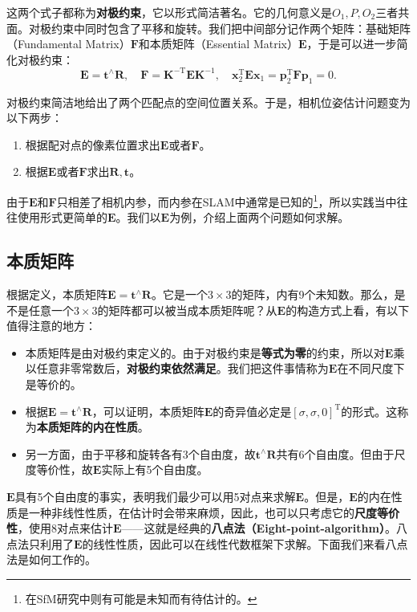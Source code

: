 这两个式子都称为\textbf{对极约束}，它以形式简洁著名。它的几何意义是$O_1, P, O_2$三者共面。对极约束中同时包含了平移和旋转。我们把中间部分记作两个矩阵：基础矩阵（Fundamental Matrix）$\bm{F}$和本质矩阵（Essential Matrix）$\bm{E}$，于是可以进一步简化对极约束：
\begin{equation}
\bm{E} = \bm{t}^ \wedge \bm{R}, \quad \bm{F} = \bm{K}^{ -\mathrm{T}} \bm{E} {\bm{K}^{ - 1}}, \quad \bm{x}_2^\mathrm{T} \bm{E} {\bm{x}_1} = \bm{p}_2^\mathrm{T} \bm{F} {\bm{p}_1} = 0.
\end{equation}

对极约束简洁地给出了两个匹配点的空间位置关系。于是，相机位姿估计问题变为以下两步：

\begin{enumerate}
	\item 根据配对点的像素位置求出$\bm{E}$或者$\bm{F}$。
	\item 根据$\bm{E}$或者$\bm{F}$求出$\bm{R}, \bm{t}$。
\end{enumerate}

由于$\bm{E}$和$\bm{F}$只相差了相机内参，而内参在SLAM中通常是已知的\footnote{在SfM研究中则有可能是未知而有待估计的。}，所以实践当中往往使用形式更简单的$\bm{E}$。我们以$\bm{E}$为例，介绍上面两个问题如何求解。

\subsection{本质矩阵}
根据定义，本质矩阵$\bm{E} = \bm{t}^\wedge \bm{R}$。它是一个$3\times 3$的矩阵，内有9个未知数。那么，是不是任意一个$3 \times 3$的矩阵都可以被当成本质矩阵呢？从$\bm{E}$的构造方式上看，有以下值得注意的地方：

\begin{itemize}
	\item 本质矩阵是由对极约束定义的。由于对极约束是\textbf{等式为零}的约束，所以对$\bm{E}$乘以任意非零常数后，\textbf{对极约束依然满足}。我们把这件事情称为$\bm{E}$在不同尺度下是等价的。
	\item 根据$\bm{E} = \bm{t}^ \wedge \bm{R}$，可以证明\textsuperscript{\cite{Hartley2003}}，本质矩阵$\bm{E}$的奇异值必定是$[\sigma, \sigma, 0]^\mathrm{T}$的形式。这称为\textbf{本质矩阵的内在性质}。
	\item 另一方面，由于平移和旋转各有3个自由度，故$\bm{t}^\wedge \bm{R}$共有6个自由度。但由于尺度等价性，故$\bm{E}$实际上有5个自由度。
\end{itemize}

$\bm{E}$具有5个自由度的事实，表明我们最少可以用5对点来求解$\bm{E}$。但是，$\bm{E}$的内在性质是一种非线性性质，在估计时会带来麻烦，因此，也可以只考虑它的\textbf{尺度等价性}，使用8对点来估计$\bm{E}$——这就是经典的\textbf{八点法（Eight-point-algorithm）}\textsuperscript{\cite{Hartley1997, Longuet-Higgins1987}}。八点法只利用了$\bm{E}$的线性性质，因此可以在线性代数框架下求解。下面我们来看八点法是如何工作的。

